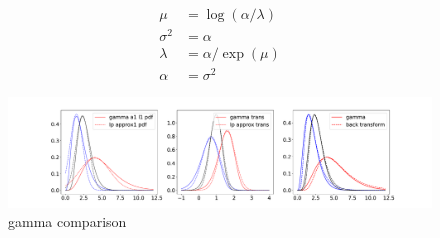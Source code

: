 \begin{align}
	\mu &= \log(\alpha/\lambda) \\
	\sigma^2 &= \alpha \\
	\lambda &= \alpha/\exp(\mu) \\
	\alpha &= \sigma^2
\end{align}

\begin{figure}[!htb]
	\centering
	\includegraphics[width=\textwidth]{figures/gamma_playground_log.pdf}
	\caption{gamma comparison}
	\label{fig:gamma_comparison}
\end{figure}